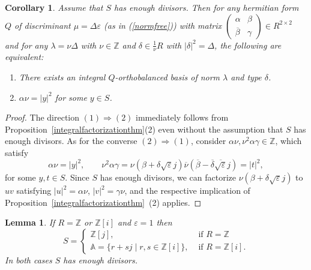 \documentclass[11pt]{amsart}
\newcommand{\ZZ}{\mathbb{Z}}
\newtheorem{lemma}[proposition]{Lemma}
\newtheorem{corollary}[proposition]{Corollary}
\theoremstyle{definition}
\theoremstyle{remark}
\begin{document}
\begin{corollary}\label{enoughdivcorollary}
Assume that $S$ has enough divisors. Then for any hermitian form $Q$ of discriminant $\mu=\Delta\varepsilon$ (as in (\ref{normfree})) with matrix $\left(\begin{smallmatrix}\alpha & \beta \\ \overline\beta & \gamma\end{smallmatrix}\right)\in R^{2\times 2}$ and for any $\lambda=\nu\Delta$ with $\nu\in\ZZ$ and $\delta\in\frac{1}{\nu} R$ with $|\delta|^2=\Delta$, the following are equivalent:
\begin{enumerate}
\item There exists an integral $Q$-orthobalanced basis of norm $\lambda$ and type $\delta$.
\item $\alpha\nu
=|y|^2$ for some $y\in S$.
\end{enumerate}
\end{corollary}

\begin{proof}
The direction $(1)\Rightarrow(2)$ immediately follows from Proposition~\ref{integralfactorizationthm}(2) even without the assumption that $S$ has enough divisors. As for the converse $(2)\Rightarrow(1)$, consider $\alpha\nu,\nu^2\alpha\gamma\in\ZZ$, which satisfy
\[
\alpha\nu=|y|^2,\qquad \nu^2\alpha\gamma=\nu(\beta+\delta\sqrt{\varepsilon}j)\overline{\nu}(\overline{\beta}-\overline{\delta}\overline{\sqrt{\varepsilon}}j)=|t|^2,
\]
for some $y,t\in S$. Since $S$ has enough divisors, we can factorize $\nu(\beta+\delta\sqrt{\varepsilon}j)$ to $uv$ satisfying $|u|^2=\alpha\nu$, $|v|^2=\gamma\nu$, and the respective implication of Proposition~\ref{integralfactorizationthm}~(2) applies.
\end{proof}


\begin{lemma}\label{enoughdivlemma}
If $R=\mathbb Z$ or $\mathbb Z[i]$ and $\varepsilon=1$ then 
\[S=\begin{cases}\mathbb Z[j], & \text{ if } R=\mathbb Z\\ \mathbb A=\{r+sj\mid r,s\in\mathbb Z[i]\}, & \text{ if }R=\mathbb Z[i].\end{cases}\]
In both cases $S$ has enough divisors.
\end{lemma}
\end{document}
